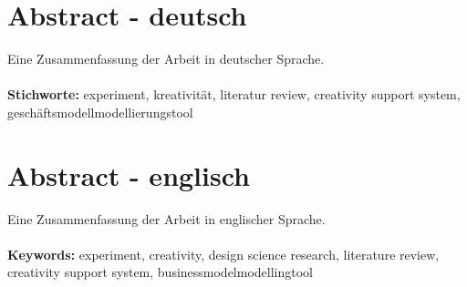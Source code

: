 \section*{Abstract - deutsch}
Eine Zusammenfassung der Arbeit in deutscher Sprache.
\\\\
{\bf Stichworte:} experiment, kreativität, literatur review, creativity support system, geschäftsmodellmodellierungstool

\section*{Abstract - englisch}
Eine Zusammenfassung der Arbeit in englischer Sprache.
\\\\
{\bf Keywords:} experiment, creativity, design science research, literature review, creativity support system, businessmodelmodellingtool 
\\\\\\